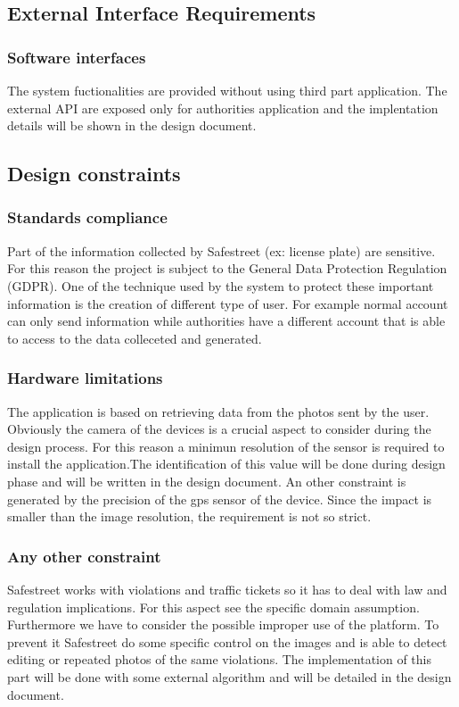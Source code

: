 
\subsection{External Interface Requirements}
\subsubsection{Software interfaces}
The system fuctionalities are provided without using third part application.
The external API are exposed only for authorities application and the implentation details will be shown in the design document.

\subsection{Design constraints}
\subsubsection{Standards compliance}
Part of the information collected by Safestreet (ex: license plate) are sensitive. For this reason the project is subject to the General Data Protection Regulation (GDPR). One of the technique used by the system to protect these important information is the creation of different type of user. For example normal account can only send information while authorities have a different account that is able to access to the data colleceted and generated.

\subsubsection{Hardware limitations}
The application is based on retrieving data from the photos sent by the user. Obviously the camera of the devices is a crucial aspect to consider during the design process. For this reason a minimun resolution of the sensor is required to install the application.The identification of this value will be done during design phase and will be written in the design document.
An other constraint is generated by the precision of the gps sensor of the device. Since the impact is smaller than the image resolution, the requirement is not so strict. 

\subsubsection{Any other constraint}
Safestreet works with violations and traffic tickets so it has to deal with law and regulation implications.
For this aspect see the specific domain assumption. 
Furthermore we have to consider the possible improper use of the platform. To prevent it Safestreet do some specific control on the images and is able to detect editing or repeated photos of the same violations. The implementation of this part will be done with some external algorithm and will be detailed in the design document.

